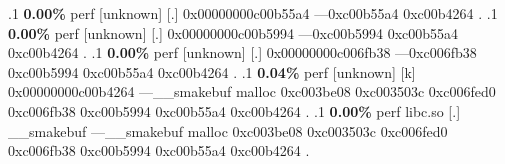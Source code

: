\begin{profile}
{.1 \textbf{ 0.00\%} perf             [unknown]              [.] 0x00000000c00b55a4\newline {} ---0xc00b55a4\newline {} 0xc00b4264\newline {} . 
.1 \textbf{ 0.00\%} perf             [unknown]              [.] 0x00000000c00b5994\newline {} ---0xc00b5994\newline {} 0xc00b55a4\newline {} 0xc00b4264\newline {} . 
.1 \textbf{ 0.00\%} perf             [unknown]              [.] 0x00000000c006fb38\newline {} ---0xc006fb38\newline {} 0xc00b5994\newline {} 0xc00b55a4\newline {} 0xc00b4264\newline {} . 
.1 \textbf{ 0.04\%} perf             [unknown]              [k] 0x00000000c00b4264\newline {} ---\_\_smakebuf\newline {} malloc\newline {} 0xc003be08\newline {} 0xc003503c\newline {} 0xc006fed0\newline {} 0xc006fb38\newline {} 0xc00b5994\newline {} 0xc00b55a4\newline {} 0xc00b4264\newline {} . 
.1 \textbf{ 0.00\%} perf             libc.so                [.] \_\_smakebuf\newline {} ---\_\_smakebuf\newline {} malloc\newline {} 0xc003be08\newline {} 0xc003503c\newline {} 0xc006fed0\newline {} 0xc006fb38\newline {} 0xc00b5994\newline {} 0xc00b55a4\newline {} 0xc00b4264\newline {} . 
}
\end{profile}
